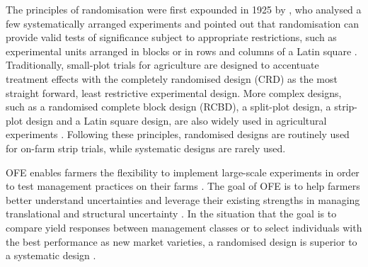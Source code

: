 \documentclass[a4paper]{article} 	%
\begin{document}
The principles of randomisation were first expounded in 1925 by \textcite{Fisher1934Statistical}, who analysed a few systematically arranged experiments and pointed out that randomisation can provide valid tests of significance subject to appropriate restrictions, such as experimental units arranged in blocks or in rows and columns of a Latin square \parencite{Verdooren2020History}. Traditionally, small-plot trials for agriculture are designed to accentuate treatment effects with the completely randomised design (CRD) as the most straight forward, least restrictive experimental design. More complex designs, such as a randomised complete block design (RCBD), a split-plot design, a strip-plot design and a Latin square design, are also widely used in agricultural experiments \parencite{Petersen1994Agricultural}. Following these principles, randomised designs are routinely used for on-farm strip trials, while systematic designs are rarely used.





OFE enables farmers the flexibility to implement large-scale experiments in order to test management practices on their farms \parencite{Evans2020Assessment}. The goal of OFE is to help farmers better understand uncertainties and leverage their existing strengths in managing translational and structural uncertainty \parencite{Cook2013Onfarm}. In the situation that the goal is to compare yield responses between management classes or to select individuals with the best performance as new market varieties, a randomised design is superior to a systematic design \parencite{Pringle2004FieldScale, Selle2019Flexible}. 
\end{document}
